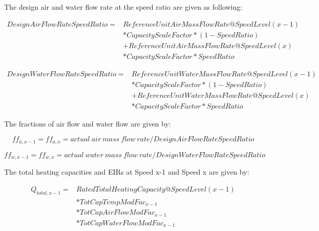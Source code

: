 The design air and water flow rate at the speed ratio are given as following:

\begin{equation}
  \begin{array}{rl}
  DesignAirFlowRateSpeedRatio =& ReferenceUnitAirMassFlowRate@SpeedLevel\left( {x - 1} \right) \\
                              &* CapacityScaleFactor * \left(1-SpeedRatio\right) \\
                              &+ ReferenceUnitAirMassFlowRate@SpeedLevel\left( x \right) \\
                              &* CapacityScaleFactor * SpeedRatio
  \end{array}
\end{equation}

\begin{equation}
  \begin{array}{rl}
    DesignWaterFlowRateSpeedRatio =& ReferenceUnitWaterMassFlowRate@SpeedLevel\left( {x - 1} \right) \\
                                  &* CapacityScaleFactor * \left(1-SpeedRatio\right) \\
                                  &+ ReferenceUnitWaterMassFlowRate@SpeedLevel\left( x \right) \\
                                  &* CapacityScaleFactor * SpeedRatio
  \end{array}
\end{equation}

The fractions of air flow and water flow are given by:

\begin{equation}
ff_{a,x-1} = ff_{a,x} = actual~air~mass~flow~rate/DesignAirFlowRateSpeedRatio
\end{equation}

\begin{equation}
ff_{w,x-1} = ff_{w,x} = actual~water~mass~flow~rate/DesignWaterFlowRateSpeedRatio
\end{equation}

The total heating capacities and EIRs at Speed x-1 and Speed x are given by:

\begin{equation}
  \begin{array}{rl}
    Q_{total,x - 1} =& RatedTotalHeatingCapacity@SpeedLevel\left( {x - 1} \right) \\
                    &* TotCapTempModFac_{x - 1} \\
                    &* TotCapAirFlowModFac_{x - 1} \\
                    &* TotCapWaterFlowModFac_{x - 1}
  \end{array}
\end{equation}

